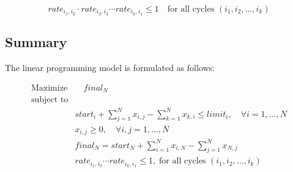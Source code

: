 \documentclass{article}
\begin{document}
\[
rate_{i_1,i_2} \cdot rate_{i_2,i_3} \cdots rate_{i_k,i_1} \leq 1 \quad \text{for all cycles } (i_1, i_2, \ldots, i_k)
\]

\subsection*{Summary}

The linear programming model is formulated as follows:

\begin{align*}
\text{Maximize} & \quad final_N \\
\text{subject to} & \\
& start_i + \sum_{j=1}^{N} x_{i,j} - \sum_{k=1}^{N} x_{k,i} \leq limit_i, \quad \forall i=1,\ldots,N \\
& x_{i,j} \geq 0, \quad \forall i,j=1,\ldots,N \\
& final_N = start_N + \sum_{i=1}^{N} x_{i,N} - \sum_{j=1}^{N} x_{N,j} \\
& rate_{i_1,i_2} \cdots rate_{i_k,i_1} \leq 1, \; \text{for all cycles } (i_1, i_2, \ldots, i_k)
\end{align*}
\end{document}
